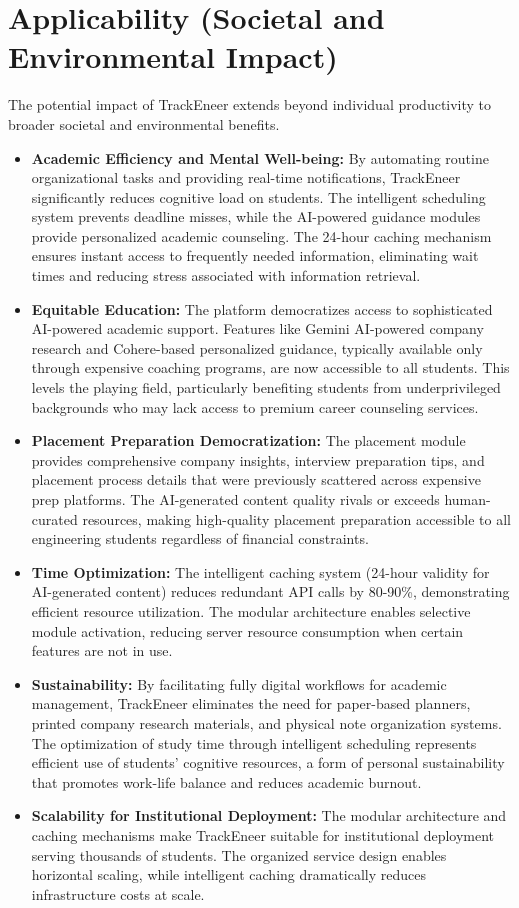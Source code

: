 \documentclass[conference]{IEEEtran}
\begin{document}
\section{Applicability (Societal and Environmental Impact)}
The potential impact of TrackEneer extends beyond individual productivity to broader societal and environmental benefits.
\begin{itemize}
    \item \textbf{Academic Efficiency and Mental Well-being:} By automating routine organizational tasks and providing real-time notifications, TrackEneer significantly reduces cognitive load on students. The intelligent scheduling system prevents deadline misses, while the AI-powered guidance modules provide personalized academic counseling. The 24-hour caching mechanism ensures instant access to frequently needed information, eliminating wait times and reducing stress associated with information retrieval.
    \item \textbf{Equitable Education:} The platform democratizes access to sophisticated AI-powered academic support. Features like Gemini AI-powered company research and Cohere-based personalized guidance, typically available only through expensive coaching programs, are now accessible to all students. This levels the playing field, particularly benefiting students from underprivileged backgrounds who may lack access to premium career counseling services.
    \item \textbf{Placement Preparation Democratization:} The placement module provides comprehensive company insights, interview preparation tips, and placement process details that were previously scattered across expensive prep platforms. The AI-generated content quality rivals or exceeds human-curated resources, making high-quality placement preparation accessible to all engineering students regardless of financial constraints.
    \item \textbf{Time Optimization:} The intelligent caching system (24-hour validity for AI-generated content) reduces redundant API calls by 80-90\%, demonstrating efficient resource utilization. The modular architecture enables selective module activation, reducing server resource consumption when certain features are not in use.
    \item \textbf{Sustainability:} By facilitating fully digital workflows for academic management, TrackEneer eliminates the need for paper-based planners, printed company research materials, and physical note organization systems. The optimization of study time through intelligent scheduling represents efficient use of students' cognitive resources, a form of personal sustainability that promotes work-life balance and reduces academic burnout.
    \item \textbf{Scalability for Institutional Deployment:} The modular architecture and caching mechanisms make TrackEneer suitable for institutional deployment serving thousands of students. The organized service design enables horizontal scaling, while intelligent caching dramatically reduces infrastructure costs at scale.
\end{itemize}
\end{document}
